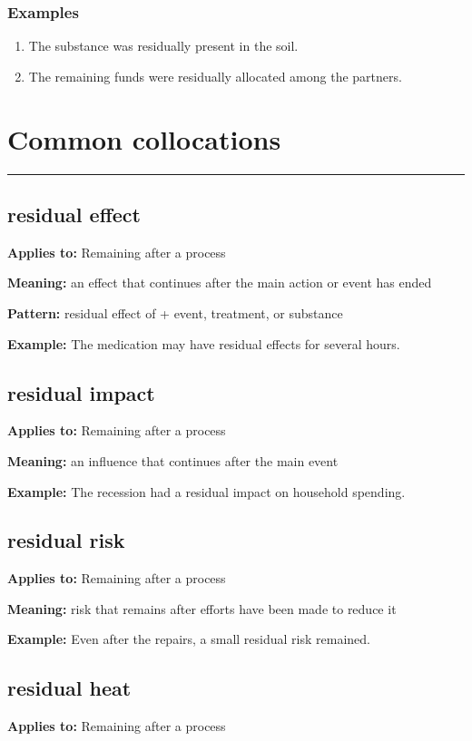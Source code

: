 \documentclass[11pt]{article}
\newcommand{\sectionrule}{\par\vspace{-0.5em}\noindent\textcolor{Accent}{\rule{\linewidth}{0.6pt}}\par}
\begin{document}
\subsubsection{Examples}
\begin{enumerate}
  \item The substance was residually present in the soil.
  \item The remaining funds were residually allocated among the partners.
\end{enumerate}

\section{Common collocations}
\sectionrule
\subsection{residual effect}
\textbf{Applies to:} Remaining after a process

\textbf{Meaning:} an effect that continues after the main action or event has ended

\textbf{Pattern:} residual effect of + event, treatment, or substance

\textbf{Example:} The medication may have residual effects for several hours.

\subsection{residual impact}
\textbf{Applies to:} Remaining after a process

\textbf{Meaning:} an influence that continues after the main event

\textbf{Example:} The recession had a residual impact on household spending.

\subsection{residual risk}
\textbf{Applies to:} Remaining after a process

\textbf{Meaning:} risk that remains after efforts have been made to reduce it

\textbf{Example:} Even after the repairs, a small residual risk remained.

\subsection{residual heat}
\textbf{Applies to:} Remaining after a process
\end{document}
